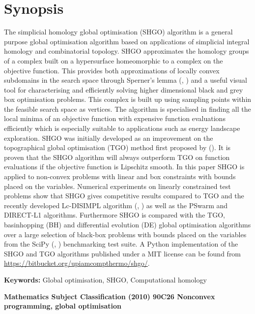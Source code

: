 \chapter*{Synopsis}
The simplicial homology global optimisation (SHGO) algorithm is a general purpose global optimisation algorithm based on applications of simplicial integral homology and combinatorial topology. SHGO approximates the homology groups of a complex built on a hypersurface homeomorphic to a complex on the objective function. This provides both approximations of locally convex subdomains in the search space through Sperner's lemma (\citeauthor{Sperner1928}, \citeyear{Sperner1928}) and a useful visual tool for characterising and efficiently solving higher dimensional black and grey box optimisation problems. This complex is built up using sampling points within the feasible search space as vertices. The algorithm is specialised in finding all the local minima of an objective function with expensive function evaluations efficiently which is especially suitable to applications such as energy landscape exploration. SHGO was initially developed as an improvement on the topographical global optimisation (TGO) method first proposed by \citeauthor{Torn1986} (\citeyear{Torn1986, Torn1990, Torn1992}). It is proven that the SHGO algorithm will always outperform TGO on function evaluations if the objective function is Lipschitz smooth. In this paper SHGO is applied to non-convex problems with linear and box constraints with bounds placed on the variables. Numerical experiments on linearly constrained test problems show that SHGO gives competitive results compared to TGO and the recently developed Lc-DISIMPL algorithm (\citeauthor{Paul2016}, \citeyear{Paul2016}) as well as the PSwarm and DIRECT-L1 algorithms. Furthermore SHGO is compared with the TGO, basinhopping (BH) and differential evolution (DE) global optimisation algorithms over a large selection of black-box problems with bounds placed on the variables from the SciPy (\citeauthor*{scipy}, \citeyear{scipy}) benchmarking test suite. A Python implementation of the SHGO and TGO algorithms published under a MIT license can be found from \url{https://bitbucket.org/upiamcompthermo/shgo/}.
\bigskip

\noindent \textbf{Keywords:} Global optimisation, SHGO, Computational homology
\begin{flushleft}\bf{Mathematics Subject Classification (2010)} \normalfont 90C26 Nonconvex programming, global optimisation
\end{flushleft}


